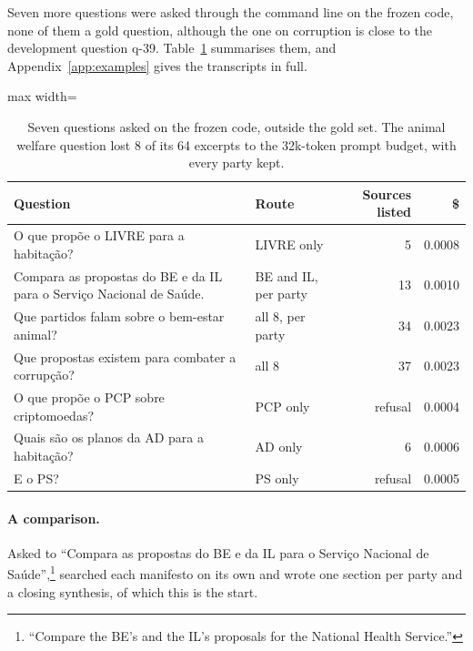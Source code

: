 Seven more questions were asked through the command line on the frozen code,
none of them a gold question, although the one on corruption is close to the
development question q-39. Table~\ref{tab:walkthrough} summarises them,
and Appendix~\ref{app:examples} gives the transcripts in full.

\begin{table}[htbp]
    \centering
    \footnotesize
    \begin{adjustbox}{max width=\textwidth}
    \begin{tabular}{|p{}|l|r|r|}
        \hline
        \textbf{Question} & \textbf{Route} & \textbf{Sources listed} & \textbf{\$} \\
        \hline
        O que propõe o LIVRE para a habitação? & LIVRE only & 5 & 0.0008 \\
        Compara as propostas do BE e da IL para o Serviço Nacional de Saúde. & BE and IL, per party & 13 & 0.0010 \\
        Que partidos falam sobre o bem-estar animal? & all 8, per party & 34 & 0.0023 \\
        Que propostas existem para combater a corrupção? & all 8 & 37 & 0.0023 \\
        O que propõe o PCP sobre criptomoedas? & PCP only & refusal & 0.0004 \\
        Quais são os planos da AD para a habitação? & AD only & 6 & 0.0006 \\
        E o PS? & PS only & refusal & 0.0005 \\
        \hline
    \end{tabular}
    \end{adjustbox}
    \caption[Questions outside the gold set]{Seven questions asked on the
    frozen code, outside the gold set. The animal welfare question lost 8 of its
    64 excerpts to the 32k-token prompt budget, with every party kept.}
    \label{tab:walkthrough}
\end{table}

\paragraph{A comparison.} Asked to ``Compara as propostas do BE e da IL para
o Serviço Nacional de Saúde'',\footnote{``Compare the BE's and the IL's
proposals for the National Health Service.''} \sysname{} searched each
manifesto on its own and wrote one section per party and a closing synthesis,
of which this is the start.

